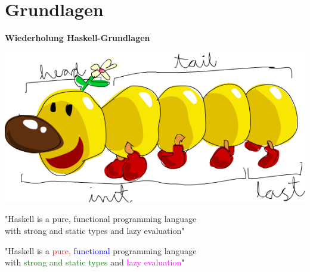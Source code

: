 \documentclass[unknownkeysallowed]{beamer}
\begin{document}

\section{Grundlagen}
\begin{frame}
\begin{center}
\Large\textbf{Wiederholung Haskell-Grundlagen} \bigskip

\includegraphics[scale=0.25]{listmonster.png} 
\end{center}
\end{frame}


\begin{frame}
\begin{center}

  "Haskell is a pure, functional programming language\\with strong and static types
  and lazy evaluation"
  
\end{center}
\end{frame}


\begin{frame}
\begin{center}

  "Haskell is a \textcolor{red}{pure,} \textcolor{blue}{functional} programming language \\ with \textcolor{green}{strong and static types} and \textcolor{magenta}{lazy evaluation}"
  
\end{center}
\end{frame}
  
\end{document}
